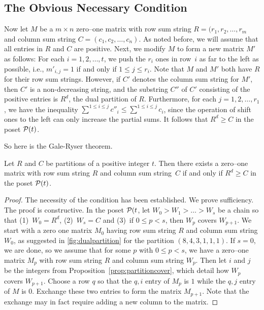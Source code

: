 \subsection{The Obvious Necessary Condition}

Now let $M$ be a $m\times n$ zero--one matrix with row sum string
$R=(r_1,r_2,\dots,r_m$ and column sum string $C=(c_1,c_2,\dots,c_n)$.
As noted before, we will assume that all entries in $R$ and $C$ are positive.
Next, we modify $M$ to form a new matrix $M'$ as follows:  For each $i=1,2,\dots,t$,
we push the $r_i$ ones in row~$i$ as far to the left as possible, i.e., 
$m'_{i,j}=1$ if and only if $1\le j\le r_i$.  Note that $M$ and $M'$
both have $R$ for their row sum strings.  However, if $C'$ denotes
the column sum string for $M'$, then $C'$ is a non-decreasing string,
and the substring $C''$ of $C'$ consisting of the positive entries
is $R^d$, the dual partition of $R$.  Furthermore, for each $j=1,2,\dots,r_1$,
we have the inequality $\sum^{1\le i\le j} c''_i\le
\sum^{1\le i\le j} c_i$, since the operation of shift ones to
the left can only increase the partial sums.   It follows that 
$R^d\ge C$ in the poset $\mathcal{P}(t)$.

So here is the Gale-Ryser theorem.

\begin{theorem}
Let $R$ and $C$ be partitions of a positive integer $t$.  Then there
exists a zero--one matrix with row sum string $R$ and column sum
string~$C$ if and only if $R^d\ge C$ in the poset $\mathcal{P}(t)$.
\end{theorem}
\begin{proof}
The necessity of the condition has been established.  We prove sufficiency.
The proof is constructive.  In the poset $\mathcal{P}(t$, let
$W_0>W_1>\dots>W_s$ be a chain so that (1)~$W_0=R^d$, (2)~$W_s=C$ and
(3)~if $0\le p<s$, then $W_p$ covers $W_{p+1}$.   We start with a zero
one matrix $M_0$ having row sum string $R$ and column sum string $W_0$,
as suggested in \autoref{fig:dualpartition} for the partition
$(8,4,3,1,1,1)$.   If $s=0$, we are done, so we assume that for some $p$ with
$0\le p<s$, we have a zero--one matrix $M_p$ with row sum string $R$ and
column sum string $W_p$.  Then let $i$ and $j$ be the integers from
Proposition~\ref{prop:partitioncover}, which detail how $W_p$ covers
$W_{p+1}$.  Choose a row $q$ so that the $q,i$ entry of $M_p$ is $1$
while the $q,j$ entry of $M$ is $0$.  Exchange these two entries
to form the matrix $M_{p+1}$.  Note that the exchange may in fact
require adding a new column to the matrix.
\end{proof}


